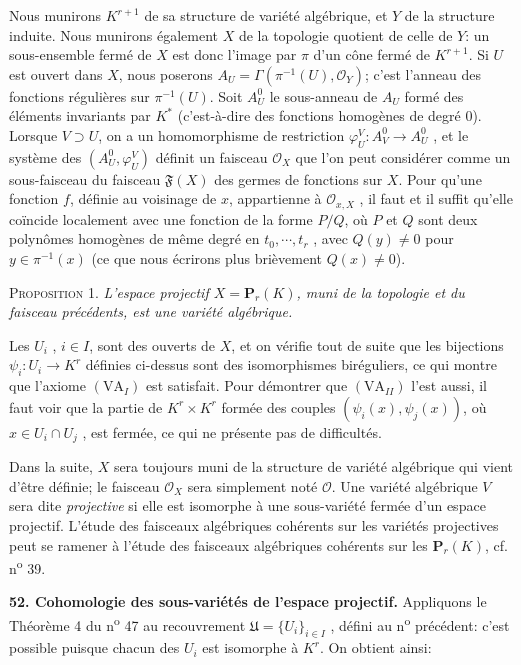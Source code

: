 Nous munirons $K^{r+1}$ de sa structure de variété algébrique, et $Y$ de la structure induite. Nous munirons également $X$ de la topologie quotient de celle de $Y$: un sous-ensemble fermé de $X$ est donc l'image par $\pi$ d'un cône fermé de $K^{r+1}$. Si $U$ est ouvert dans $X$, nous poserons $A_U = \Gamma(\pi^{-1}(U), \mathcal{O}_Y)$; c'est l'anneau des fonctions régulières sur $\pi^{-1}(U)$. Soit $A_U^0$ le sous-anneau de $A_U$ formé des éléments invariants par $K^*$ (c'est-à-dire des fonctions homogènes de degré 0). Lorsque $V \supset U$, on a un homomorphisme de restriction $\varphi_U^V : A_V^0 \to A_U^0$ , et le système des $(A_U^0 , \varphi_U^V)$ définit un faisceau $\mathcal{O}_X$ que l'on peut considérer comme un sous-faisceau du faisceau $\mathfrak{F}(X)$ des germes de fonctions sur $X$. Pour qu'une fonction $f$, définie au voisinage de $x$, appartienne à $\mathcal{O}_{x,X}$ , il faut et il suffit qu'elle coïncide localement avec une fonction de la forme $P/Q$, où $P$ et $Q$ sont deux polynômes homogènes
de même degré en $t_0 , \cdots , t_r$ , avec $Q(y) \neq 0$ pour $y \in \pi^{-1}(x)$ (ce que nous écrirons plus brièvement $Q(x) \neq 0$).

\textsc{Proposition} 1. \textit{L'espace projectif $X = \mathbf{P}_r(K)$, muni de la topologie et du faisceau précédents, est une variété algébrique.}

Les $U_i$ , $i \in I$, sont des ouverts de $X$, et on vérifie tout de suite que les bijections $\psi_i : U_i \to K^r$ définies ci-dessus sont des isomorphismes biréguliers, ce qui montre que l'axiome $(\mathrm{VA}_I)$ est satisfait. Pour démontrer que $(\mathrm{VA}_{II})$ l'est aussi, il faut voir que la partie de $K^r \times K^r$ formée des couples $(\psi_i(x), \psi_j(x))$, où $x \in U_i \cap U_j$ , est fermée, ce qui ne présente pas de difficultés.

Dans la suite, $X$ sera toujours muni de la structure de variété algébrique qui vient d'être définie; le faisceau $\mathcal{O}_X$ sera simplement noté $\mathcal{O}$. Une variété algébrique $V$ sera dite \textit{projective} si elle est isomorphe à une sous-variété fermée d'un espace projectif. L'étude des faisceaux algébriques cohérents sur les variétés projectives peut se ramener à l'étude des faisceaux algébriques cohérents sur les $\mathbf{P}_r(K)$, cf. n\textsuperscript{o} 39.

\textbf{52. Cohomologie des sous-variétés de l'espace projectif.} Appliquons le Théorème 4 du n\textsuperscript{o} 47 au recouvrement $\mathfrak{U} = \{U_i\}_{i \in I}$ , défini au n\textsuperscript{o} précédent: c'est possible puisque chacun des $U_i$ est isomorphe à $K^r$. On obtient ainsi:

